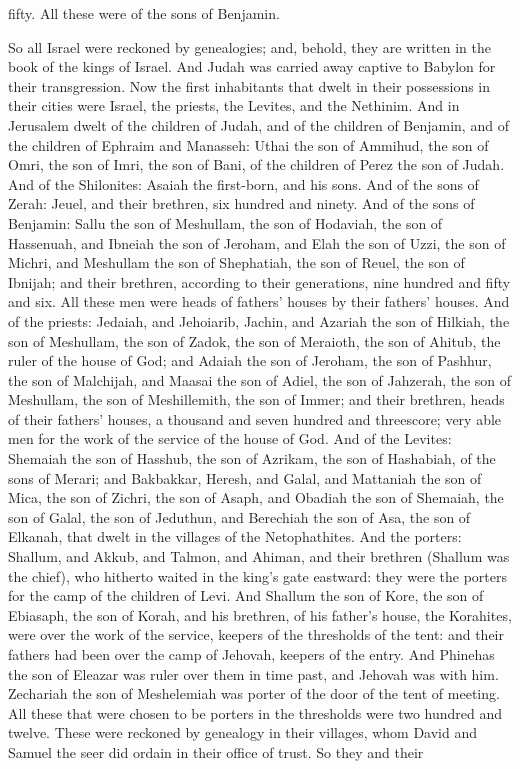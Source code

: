 fifty. All these were of the sons of Benjamin. 

So all Israel were reckoned by genealogies; and, behold, they are written in the book of the kings of Israel. And Judah was carried away captive to Babylon for their transgression. Now the first inhabitants that dwelt in their possessions in their cities were Israel, the priests, the Levites, and the Nethinim. And in Jerusalem dwelt of the children of Judah, and of the children of Benjamin, and of the children of Ephraim and Manasseh: Uthai the son of Ammihud, the son of Omri, the son of Imri, the son of Bani, of the children of Perez the son of Judah. And of the Shilonites: Asaiah the first-born, and his sons. And of the sons of Zerah: Jeuel, and their brethren, six hundred and ninety. And of the sons of Benjamin: Sallu the son of Meshullam, the son of Hodaviah, the son of Hassenuah, and Ibneiah the son of Jeroham, and Elah the son of Uzzi, the son of Michri, and Meshullam the son of Shephatiah, the son of Reuel, the son of Ibnijah; and their brethren, according to their generations, nine hundred and fifty and six. All these men were heads of fathers’ houses by their fathers’ houses.  And of the priests: Jedaiah, and Jehoiarib, Jachin, and Azariah the son of Hilkiah, the son of Meshullam, the son of Zadok, the son of Meraioth, the son of Ahitub, the ruler of the house of God; and Adaiah the son of Jeroham, the son of Pashhur, the son of Malchijah, and Maasai the son of Adiel, the son of Jahzerah, the son of Meshullam, the son of Meshillemith, the son of Immer; and their brethren, heads of their fathers’ houses, a thousand and seven hundred and threescore; very able men for the work of the service of the house of God.  And of the Levites: Shemaiah the son of Hasshub, the son of Azrikam, the son of Hashabiah, of the sons of Merari; and Bakbakkar, Heresh, and Galal, and Mattaniah the son of Mica, the son of Zichri, the son of Asaph, and Obadiah the son of Shemaiah, the son of Galal, the son of Jeduthun, and Berechiah the son of Asa, the son of Elkanah, that dwelt in the villages of the Netophathites.  And the porters: Shallum, and Akkub, and Talmon, and Ahiman, and their brethren (Shallum was the chief), who hitherto waited in the king’s gate eastward: they were the porters for the camp of the children of Levi. And Shallum the son of Kore, the son of Ebiasaph, the son of Korah, and his brethren, of his father’s house, the Korahites, were over the work of the service, keepers of the thresholds of the tent: and their fathers had been over the camp of Jehovah, keepers of the entry. And Phinehas the son of Eleazar was ruler over them in time past, and Jehovah was with him. Zechariah the son of Meshelemiah was porter of the door of the tent of meeting. All these that were chosen to be porters in the thresholds were two hundred and twelve. These were reckoned by genealogy in their villages, whom David and Samuel the seer did ordain in their office of trust. So they and their 